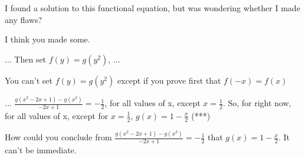 \begin{solution}
	\begin{tcolorbox}I found a solution to this functional equation, but was wondering whether I made any flaws?\end{tcolorbox}

I think you made some.

\begin{tcolorbox} 
...
Then set $ f(y) = g(y^{2})$, 
...
\end{tcolorbox}

You can't set $ f(y) = g(y^{2})$ except if you prove first that $ f(-x)=f(x)$

\begin{tcolorbox} 
...
$ \frac {g(x^{2} - 2x + 1) - g(x^{2})}{ - 2x + 1} = - \frac {1}{2}$, for all values of x, except $ x = \frac {1}{2}$.  So, for right now, for all values of x, except for $ x = \frac {1}{2}$, $ g(x) = 1 - \frac {x}{2}$ (***)\end{tcolorbox}

How could you conclude from $ \frac {g(x^{2} - 2x + 1) - g(x^{2})}{ - 2x + 1} = - \frac {1}{2}$ that $ g(x) = 1 - \frac {x}{2}$.
It can't be immediate.
\end{solution}



